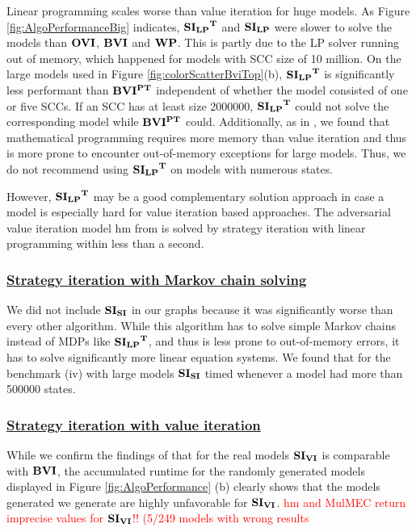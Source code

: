 Linear programming scales worse than value iteration for huge models.
As Figure \ref{fig:AlgoPerformanceBig} indicates, $\mathbf{\mathbf{SI_{LP}}^T}$ and $\mathbf{SI_{LP}}$ were slower to solve the models than $\mathbf{OVI}$, $\mathbf{BVI}$ and $\mathbf{WP}$.
This is partly due to the LP solver running out of memory, which happened for models with SCC size of 10 million. 
On the large models used in Figure \ref{fig:colorScatterBviTop}(b), $\mathbf{\mathbf{SI_{LP}}^T}$ is significantly less performant than $\mathbf{BVI^{PT}}$ independent of whether the model consisted of one or five SCCs.
If an SCC has at least size 2000000, $\mathbf{\mathbf{SI_{LP}}^T}$ could not solve the corresponding model while $\mathbf{BVI^{PT}}$ could.
Additionally, as in \cite{gandalf}, we found that mathematical programming requires more memory than value iteration and thus is more prone to encounter 
out-of-memory exceptions for large models. Thus, we do not recommend using $\mathbf{\mathbf{SI_{LP}}^T}$ on models with numerous states. 

However, $\mathbf{\mathbf{SI_{LP}}^T}$ may be a good complementary solution approach in case a model is especially hard for value iteration based approaches.
The adversarial value iteration model hm from \cite{haddadmonmege} is solved by strategy iteration with linear programming within less than a second.

\subsubsection*{\underline{Strategy iteration with Markov chain solving}}
We did not include $\mathbf{SI_{SI}}$ in our graphs because it was significantly worse than every other algorithm.
While this algorithm has to solve simple Markov chains instead of MDPs like $\mathbf{\mathbf{SI_{LP}}^T}$, and thus is less prone to out-of-memory errors, 
it has to solve significantly more linear equation systems.
We found that for the benchmark (iv) with large models $\mathbf{SI_{SI}}$ timed whenever a model had more than 500000 states.

\subsubsection*{\underline{Strategy iteration with value iteration}}
While we confirm the findings of \cite{gandalf} that for the real models $\mathbf{SI_{VI}}$ is comparable with $\mathbf{BVI}$, 
the accumulated runtime for the randomly generated models displayed in Figure \ref{fig:AlgoPerformance} (b) clearly shows that 
the models generated we generate are highly unfavorable for $\mathbf{SI_{VI}}$.
\textcolor{red}{hm and MulMEC return imprecise values for $\mathbf{SI_{VI}}$!! (5/249 models with wrong results}

